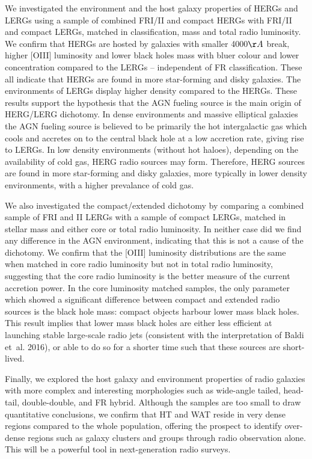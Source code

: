 \documentclass[usenatbib]{mn2e}
\begin{document}
We investigated the environment and the host galaxy properties of HERGs
and LERGs using a sample of combined FRI/II and compact HERGs with FRI/II
and compact LERGs, matched in classification, mass and total radio
luminosity. We confirm that HERGs are hosted by galaxies with smaller
4000$\AA$ break, higher [OIII] luminosity and lower black holes mass with
bluer colour and lower concentration compared to the LERGs -- independent
of FR classification. These all indicate that HERGs are found in more
star-forming and disky galaxies. The environments of LERGs display higher
density compared to the HERGs. These results support the hypothesis that the AGN fueling
source is the main origin of HERG/LERG dichotomy. In dense environments
and massive elliptical galaxies the AGN fueling source is believed to be
primarily the hot intergalactic gas which cools and accretes on to the
central black hole at a low accretion rate, giving rise to LERGs. In low
density environments (without hot haloes), depending on the availability
of cold gas, HERG radio sources may form. Therefore, HERG sources are
found in more star-forming and disky galaxies, more typically in lower
density environments, with a higher prevalance of cold gas.

We also investigated the compact/extended dichotomy by comparing a
combined sample of FRI and II LERGs with a sample of compact LERGs,
matched in stellar mass and either core or total radio luminosity.  In
neither case did we find any difference in the AGN environment, indicating
that this is not a cause of the dichotomy. We confirm that the [OIII]
luminosity distributions are the same when matched in core radio
luminosity but not in total radio luminosity, suggesting that the core
radio luminosity is the better measure of the current accretion power. In
the core luminosity matched samples, the only parameter which showed a
significant difference between compact and extended radio sources is the
black hole mass: compact objects harbour lower mass black holes. This
result implies that lower mass black holes are either less efficient at
launching stable large-scale radio jets (consistent with the
interpretation of Baldi et~al. 2016), or able to do so for a shorter time
such that these sources are short-lived.

Finally, we explored the host galaxy and environment properties of radio
galaxies with more complex and interesting morphologies such as wide-angle tailed, 
head-tail, double-double, and FR hybrid. Although the samples are too small to draw quantitative
conclusions, we confirm that HT and WAT reside in very dense regions
compared to the whole population, offering the prospect to identify
over-dense regions such as galaxy clusters and groups through radio
observation alone. This will be a powerful tool in next-generation radio
surveys. 
\end{document}
